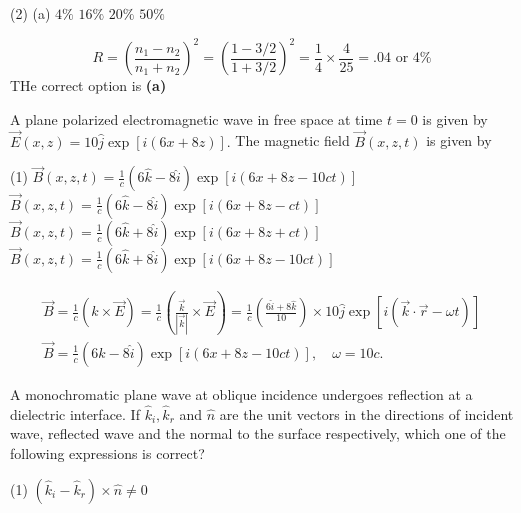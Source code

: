 \begin{enumerate}
	\begin{tasks}(2)
		\task[\textbf{A.}](a) $4 \%$
		\task[\textbf{B.}] $16 \%$
		\task[\textbf{C.}]$20 \%$
		\task[\textbf{D.}]$50 \%$
	\end{tasks}
	\begin{answer}
		$$R=\left(\frac{n_{1}-n_{2}}{n_{1}+n_{2}}\right)^{2}=\left(\frac{1-3 / 2}{1+3 / 2}\right)^{2}=\frac{1}{4} \times \frac{4}{25}=.04 \text { or } 4 \%	$$
		THe correct option is \textbf{(a)}
	\end{answer}
	\begin{minipage}{\textwidth}
		\item A plane polarized electromagnetic wave in free space at time $t=0$ is given by $\vec{E}(x, z)=10 \hat{j} \exp [i(6 x+8 z)] .$ The magnetic field $\vec{B}(x, z, t)$ is given by
	\end{minipage}
	\begin{tasks}(1)
		\task[\textbf{A.}] $\vec{B}(x, z, t)=\frac{1}{c}(6 \hat{k}-8 \hat{i}) \exp [i(6 x+8 z-10 c t)]$ 
		\task[\textbf{C.}]$\vec{B}(x, z, t)=\frac{1}{c}(6 \hat{k}-8 \hat{i}) \exp [i(6 x+8 z-c t)]$
		\task[\textbf{D.}]$\vec{B}(x, z, t)=\frac{1}{c}(6 \hat{k}+8 \hat{i}) \exp [i(6 x+8 z+c t)]$
		\task[\textbf{B.}]$\vec{B}(x, z, t)=\frac{1}{c}(6 \hat{k}+8 \hat{i}) \exp [i(6 x+8 z-10 c t)]$
	\end{tasks}
	\begin{answer}
		$$\begin{gathered}
		\vec{B}=\frac{1}{c}(\hat{k} \times \vec{E})=\frac{1}{c}\left(\frac{\vec{k}}{|\vec{k}|} \times \vec{E}\right)=\frac{1}{c}\left(\frac{6 \hat{i}+8 \hat{k}}{10}\right) \times 10 \hat{j} \exp [i(\vec{k} \cdot \vec{r}-\omega t)] \\
		\vec{B}=\frac{1}{c}(6 \hat{k}-8 \hat{i}) \exp [i(6 x+8 z-10 c t)], \quad \omega=10 c .
		\end{gathered}$$
	\end{answer}
	\begin{minipage}{\textwidth}
		\item A monochromatic plane wave at oblique incidence undergoes reflection at a dielectric interface. If $\hat{k}_{i}, \hat{k}_{r}$ and $\hat{n}$ are the unit vectors in the directions of incident wave, reflected wave and the normal to the surface respectively, which one of the following expressions is correct?
	\end{minipage}
	\begin{tasks}(1)
		\task[\textbf{A.}] $\left(\hat{k}_{i}-\hat{k}_{r}\right) \times \hat{n} \neq 0$

\end{tasks}
\end{enumerate}
